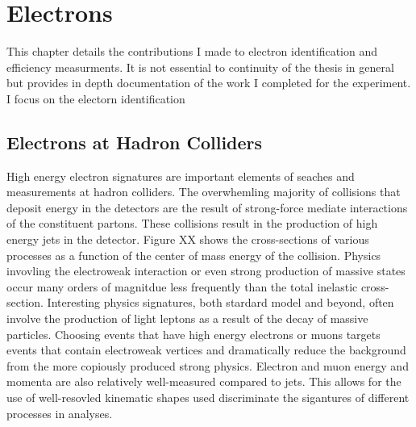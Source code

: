 \chapter[Electrons][Electrons]{Electrons}

This chapter details the contributions I made to electron identification and efficiency measurments. It is not essential to continuity of the thesis in general but provides in depth documentation of the work I completed for the experiment. I focus on the electorn identification

\section{Electrons at Hadron Colliders}

High energy electron signatures are important elements of seaches and measurements at hadron colliders. The overwhemling majority of collisions that deposit energy in the detectors are the result of strong-force mediate interactions of the constituent partons. These collisions result in the production of high energy jets in the detector. Figure XX shows the cross-sections of various processes as a function of the center of mass energy of the collision. Physics invovling the electroweak interaction or even strong production of massive states occur many orders of magnitdue less frequently than the total inelastic cross-section. 
Interesting physics signatures, both stardard model and beyond, often involve the production of light leptons as a result of the decay of massive particles. Choosing events that have high energy electrons or muons targets events that contain electroweak vertices and dramatically reduce the background from the more copiously produced strong physics. Electron and muon energy and momenta are also relatively well-measured compared to jets. This allows for the use of well-resovled kinematic shapes used discriminate the sigantures of different processes in analyses. 

